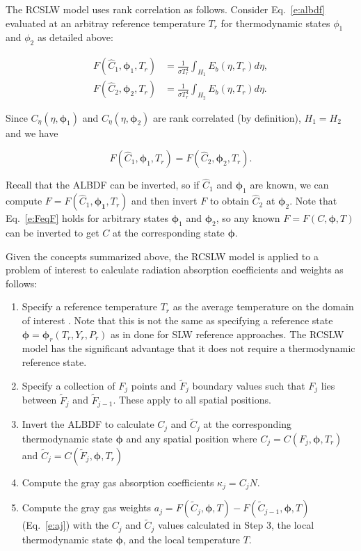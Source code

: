 \documentclass[preprint,12pt]{elsarticle}
\newcommand{\BS}{\boldsymbol}
\begin{document}
The RCSLW model uses rank correlation as follows.
Consider Eq.~\ref{e:albdf} evaluated at an arbitray reference temperature $T_r$ for thermodynamic states $\phi_1$ and $\phi_2$ as detailed above:
%
\begin{linenomath}
    \begin{align} \label{e:albdf2}
        F(\hat{C}_1,\BS{\phi}_1,T_r) &= \frac{1}{\sigma T_r^4}\int_{H_1}E_b(\eta,T_r)d\eta, \\
        F(\hat{C}_2,\BS{\phi}_2,T_r) &= \frac{1}{\sigma T_r^4}\int_{H_2}E_b(\eta,T_r)d\eta.
    \end{align}
\end{linenomath}
%
Since $C_\eta(\eta,\BS{\phi}_1)$ and $C_\eta(\eta,\BS{\phi}_2)$ are rank correlated (by definition), $H_1=H_2$ and we have 
%
\begin{linenomath}
    \begin{equation}\label{e:FeqF}
    F(\hat{C}_1,\BS{\phi}_1,T_r)=F(\hat{C}_2,\BS{\phi}_2,T_r).
\end{equation}
\end{linenomath}
%
Recall that the ALBDF can be inverted, so if $\hat{C}_1$ and $\BS{\phi}_1$ are known, we can compute $F=F(\hat{C}_1,\BS{\phi_1},T_r)$ and then invert $F$ to obtain $\hat{C}_2$ at $\BS{\phi}_2$. Note that Eq.~\ref{e:FeqF} holds for arbitrary states $\BS{\phi}_1$ and $\BS{\phi}_2$, so any known $F=F(C,\BS{\phi},T)$ can be inverted to get $C$ at the corresponding state $\BS{\phi}$. 

Given the concepts summarized above, the RCSLW model is applied to a problem of interest to calculate radiation absorption coefficients and weights as follows:
%
\begin{enumerate}
    \item Specify a reference temperature $T_r$ as the average temperature on the domain of interest \cite{Solovjov_2001}. Note that this is not the same as specifying a reference state $\BS{\phi}=\BS{\phi}_r(T_r,Y_r,P_r)$ as in done for SLW reference approaches. The RCSLW model has the significant advantage that it does not require a thermodynamic reference state.
    \item Specify a collection of $F_j$ points and $\tilde{F}_j$ boundary values such that $F_j$ lies between $\tilde{F}_j$ and $\tilde{F}_{j-1}$. These apply to all spatial positions. 
    \item Invert the ALBDF to calculate $C_j$ and $\tilde{C}_j$ at the corresponding thermodynamic state $\BS{\phi}$ and any spatial position where $C_j = C(F_j,\BS{\phi},T_r)$ and $\tilde{C}_j = C(\tilde{F}_j,\BS{\phi},T_r)$
    \item Compute the gray gas absorption coefficients $\kappa_j=C_jN$. 
    \item Compute the gray gas weights $a_j=F(\tilde{C}_j,\BS{\phi}, T) - F(\tilde{C}_{j-1},\BS{\phi}, T)$ (Eq.~\ref{e:aj}) with the $C_j$ and $\tilde{C}_j$ values calculated in Step 3, the local thermodynamic state $\BS{\phi}$, and the local temperature $T$.
\end{enumerate}
\end{document}
